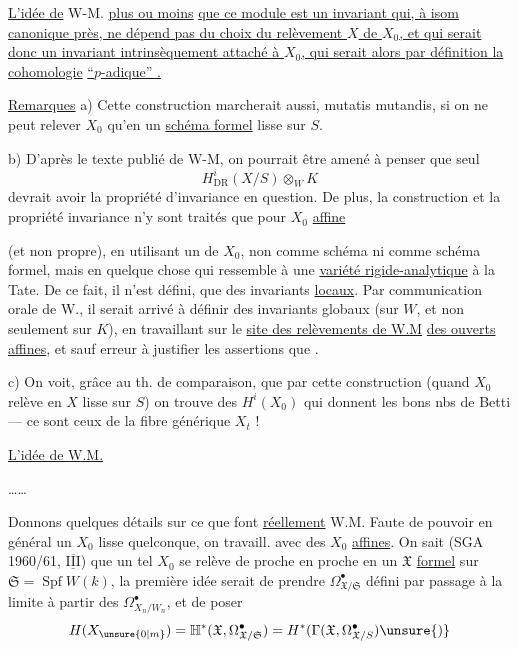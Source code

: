 

\uline{L'idée de} W-M.   \uline{plus ou moins}  \uline{que ce module est un invariant qui, à isom canonique près, ne dépend pas du choix du relèvement $X$ de $X_0$, et qui serait donc un invariant intrinsèquement attaché à $X_0$, qui serait alors par définition la cohomologie}  \uline{``$p$-adique'' .}


\uline{Remarques} a) Cette construction marcherait aussi, mutatis mutandis, si on ne peut relever $X_0$ qu'en un \uline{schéma formel} lisse sur $S$.

b) D'après le texte publié de W-M,  on pourrait  être amené à penser que seul
\[
H^i_{\mathrm{DR}}(X/S)\otimes_W K
\]
 devrait avoir la propriété d'invariance en question. De plus, la construction et la propriété invariance n'y sont traités que pour $X_0$ \uline{affine}



(et non propre), en utilisant un  de $X_0$, non comme schéma ni comme schéma formel, mais en quelque chose qui ressemble à une \uline{variété rigide-analytique} à la Tate. De ce fait, il n'est défini,  que des invariants \uline{locaux}. Par communication orale de W., il serait arrivé à définir des invariants globaux (sur $W$, et non seulement sur $K$), en travaillant  sur le \uline{site des relèvements de W.M}  \uline{des ouverts affines}, et sauf erreur à justifier les assertions que .

c) On voit, grâce au th. de comparaison, que par cette construction (quand $X_0$  relève en $X$ lisse sur $S$) on trouve des $H^i(X_0)$ qui donnent les bons nbs de Betti --- ce sont ceux de la fibre générique $X_t$ !



\uline{L'idée de W.M.}

\ldots\ldots

Donnons quelques détails sur ce que font \uline{réellement} W.M. Faute de pouvoir  en général un $X_0$ lisse quelconque, on travaill.  avec des $X_0$ \uline{affines}. On sait (SGA 1960/61, $\overline{\underline{\mathrm{III}}}$) que un tel $X_0$ se relève de proche en proche en un $\mathfrak X$ \uline{formel}  sur $\mathfrak S=\operatorname{Spf}W(k)$,  la première idée serait de prendre $\Omega^\bullet_{\mathfrak X/\mathfrak S}$ défini par passage à la limite à partir des $\Omega^\bullet_{X_n/W_n}$, et de poser
\[
H(X_{\unsure{0|m}})=\mathbb H^*(\mathfrak X,\Omega^\bullet_{\mathfrak X/\mathfrak S})
=H^*(\Gamma(\mathfrak X,\Omega^\bullet_{\mathfrak X/S})\unsure{)}
\]


